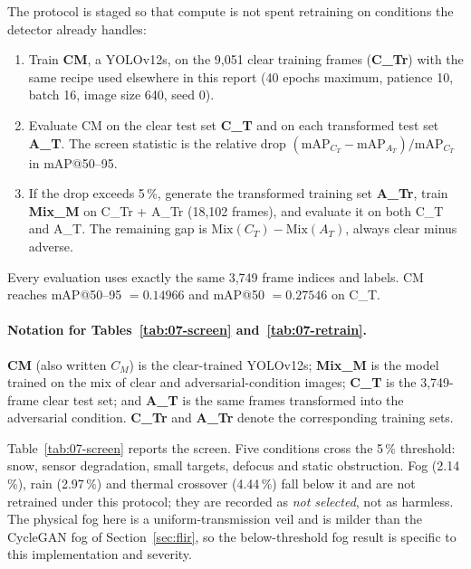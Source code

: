 \documentclass[11pt,a4paper]{article}
\begin{document}
The protocol is staged so that compute is not spent retraining on conditions the
detector already handles:
\begin{enumerate}[leftmargin=1.4em]
  \item Train \textbf{CM}, a YOLOv12s, on the 9,051 clear training frames
        (\textbf{C\_Tr}) with the same recipe used elsewhere in this report
        (40 epochs maximum, patience 10, batch 16, image size 640, seed 0).
  \item Evaluate CM on the clear test set \textbf{C\_T} and on each transformed
        test set \textbf{A\_T}. The screen statistic is the relative drop
        $(\mathrm{mAP}_{C_T} - \mathrm{mAP}_{A_T}) / \mathrm{mAP}_{C_T}$ in
        mAP@50--95.
  \item If the drop exceeds 5\,\%, generate the transformed training set
        \textbf{A\_Tr}, train \textbf{Mix\_M} on C\_Tr + A\_Tr (18,102 frames),
        and evaluate it on both C\_T and A\_T. The remaining gap is
        $\mathrm{Mix}(C_T) - \mathrm{Mix}(A_T)$, always clear minus adverse.
\end{enumerate}
Every evaluation uses exactly the same 3,749 frame indices and labels.
CM reaches mAP@50--95 $= 0.14966$ and mAP@50 $= 0.27546$ on C\_T.

\paragraph{Notation for Tables~\ref{tab:07-screen} and~\ref{tab:07-retrain}.}
\textbf{CM} (also written $C_M$) is the clear-trained YOLOv12s;
\textbf{Mix\_M} is the model trained on the mix of clear and
adversarial-condition images; \textbf{C\_T} is the 3,749-frame clear test set;
and \textbf{A\_T} is the same frames transformed into the adversarial condition.
\textbf{C\_Tr} and \textbf{A\_Tr} denote the corresponding training sets.

Table~\ref{tab:07-screen} reports the screen. Five conditions cross the 5\,\%
threshold: snow, sensor degradation, small targets, defocus and static
obstruction. Fog (2.14\,\%), rain (2.97\,\%) and thermal crossover (4.44\,\%)
fall below it and are not retrained under this protocol; they are recorded as
\emph{not selected}, not as harmless. The physical fog here is a
uniform-transmission veil and is milder than the CycleGAN fog of
Section~\ref{sec:flir}, so the below-threshold fog result is specific to this
implementation and severity.
\end{document}
